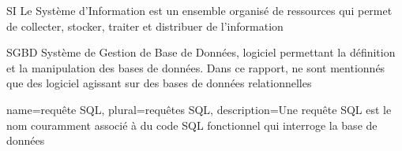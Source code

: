                            {SI}
                           {Le Système d'Information est un ensemble organisé de ressources qui permet de collecter, stocker, traiter et distribuer de l'information}

                           {SGBD}
                           {Système de Gestion de Base de Données, logiciel permettant la définition et la manipulation des bases de données. Dans ce rapport, ne sont mentionnés que des logiciel agissant sur des bases de données relationnelles}

        {name={requête SQL},
        plural={requêtes SQL},
        description=Une requête SQL est le nom couramment associé à du code SQL fonctionnel qui interroge la base de données}
